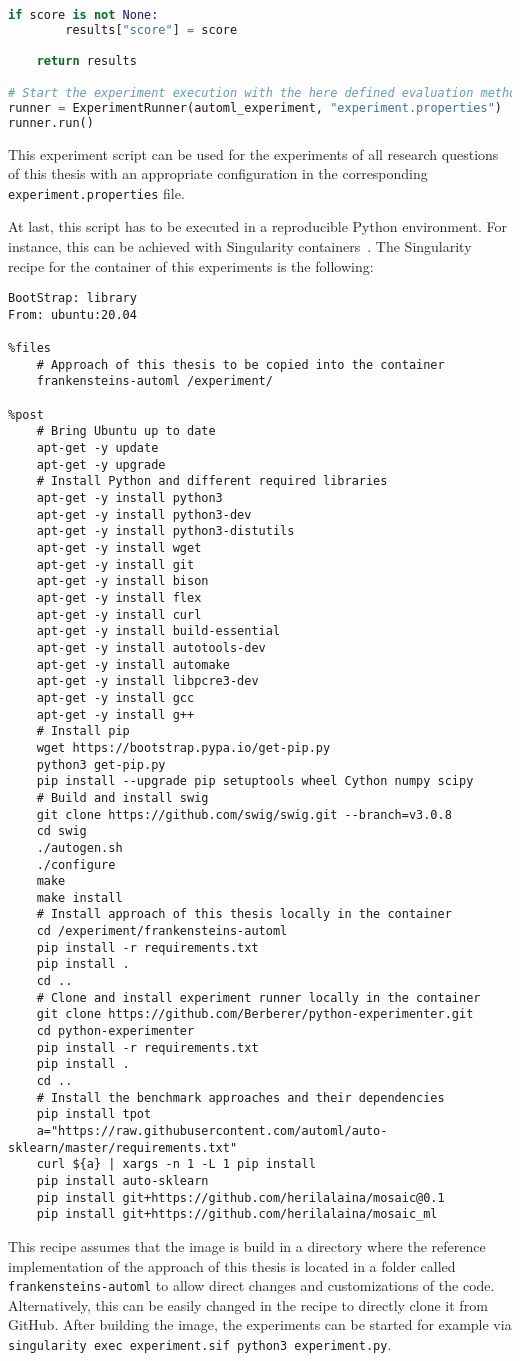 \begin{lstlisting}[language=Python]
    if score is not None:
        results["score"] = score

    return results

# Start the experiment execution with the here defined evaluation method
runner = ExperimentRunner(automl_experiment, "experiment.properties")
runner.run()
\end{lstlisting}
This experiment script can be used for the experiments of all research questions of this thesis with an appropriate configuration in the corresponding \texttt{experiment.properties} file.

At last, this script has to be executed in a reproducible Python environment.
For instance, this can be achieved with Singularity containers~\cite{Kurtzer-Singularity}.
The Singularity recipe for the container of this experiments is the following:
\begin{verbatim}
BootStrap: library
From: ubuntu:20.04

%files
    # Approach of this thesis to be copied into the container
    frankensteins-automl /experiment/

%post
    # Bring Ubuntu up to date
    apt-get -y update
    apt-get -y upgrade
    # Install Python and different required libraries
    apt-get -y install python3
    apt-get -y install python3-dev
    apt-get -y install python3-distutils
    apt-get -y install wget
    apt-get -y install git
    apt-get -y install bison
    apt-get -y install flex
    apt-get -y install curl
    apt-get -y install build-essential
    apt-get -y install autotools-dev
    apt-get -y install automake
    apt-get -y install libpcre3-dev
    apt-get -y install gcc
    apt-get -y install g++
    # Install pip
    wget https://bootstrap.pypa.io/get-pip.py
    python3 get-pip.py
    pip install --upgrade pip setuptools wheel Cython numpy scipy
    # Build and install swig
    git clone https://github.com/swig/swig.git --branch=v3.0.8
    cd swig
    ./autogen.sh
    ./configure
    make
    make install
    # Install approach of this thesis locally in the container
    cd /experiment/frankensteins-automl
    pip install -r requirements.txt
    pip install .
    cd ..
    # Clone and install experiment runner locally in the container
    git clone https://github.com/Berberer/python-experimenter.git
    cd python-experimenter
    pip install -r requirements.txt
    pip install .
    cd ..
    # Install the benchmark approaches and their dependencies
    pip install tpot
    a="https://raw.githubusercontent.com/automl/auto-sklearn/master/requirements.txt"
    curl ${a} | xargs -n 1 -L 1 pip install
    pip install auto-sklearn
    pip install git+https://github.com/herilalaina/mosaic@0.1
    pip install git+https://github.com/herilalaina/mosaic_ml
\end{verbatim}
This recipe assumes that the image is build in a directory where the reference implementation of the approach of this thesis is located in a folder called \texttt{frankensteins-automl} to allow direct changes and customizations of the code.
Alternatively, this can be easily changed in the recipe to directly clone it from GitHub.\newline
After building the image, the experiments can be started for example via \texttt{singularity exec experiment.sif python3 experiment.py}.
